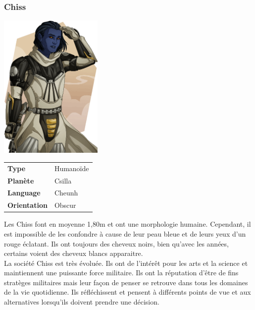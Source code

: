 \subsubsection{Chiss}
\begin{samepage}
	\includegraphics[width=5cm]{img/personnages/races/chiss.png}

	\vspace{-9\baselineskip}

	\begin{flushright}
		\begin{tabular}{ l l }
			\textbf{Type} 			& Humanoïde \\
		   	\textbf{Planète} 		& Csilla \\
		   	\textbf{Language} 		& Cheunh \\
		   	\textbf{Orientation} 	& Obscur \\
		\end{tabular}
	\end{flushright}
	\vspace{4\baselineskip}
\end{samepage}

Les Chiss font en moyenne 1,80m et ont une morphologie humaine. Cependant, il est impossible de les confondre à cause de leur peau bleue et de leurs yeux d’un rouge éclatant. Ils ont toujours des cheveux noirs, bien qu’avec les années, certains voient des cheveux blancs apparaitre. \\ 

La société Chiss est très évoluée. Ils ont de l’intérêt pour les arts et la science et maintiennent une puissante force militaire. Ils ont la réputation d’être de fins stratèges militaires mais leur façon de penser se retrouve dans tous les domaines de la vie quotidienne. Ils réfléchissent et pensent à différents points de vue et aux alternatives lorsqu’ils doivent prendre une décision.  

